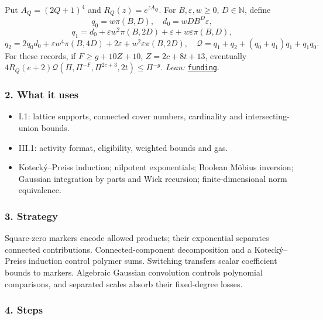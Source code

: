 \documentclass[
  letterpaper,
  11pt]{article}
\providecommand{\tightlist}{%
  \setlength{\itemsep}{0pt}\setlength{\parskip}{0pt}}
\begin{document}
Put \(A_Q=(2Q+1)^4\) and \(R_Q(z)=e^{zA_Q}\). For
\(B,\varepsilon,w\ge0\), \(D\in\mathbb N\), define
\[q_0=w\pi(B,D),\quad d_0=wDB^D\varepsilon,\]
\[q_1=d_0+\varepsilon w^2\pi(B,2D)+\varepsilon+w\varepsilon\pi(B,D),\]
\[q_2=2q_0d_0+\varepsilon w^4\pi(B,4D)+2\varepsilon+w^2\varepsilon\pi(B,2D),\quad\mathcal Q=q_1+q_2+(q_0+q_1)q_1+q_1q_0.\]
For these records, if \(F\ge g+10Z+10\), \(Z=2c+8t+13\), eventually
\(4R_Q(e+2)\mathcal Q(\Pi,\Pi^{-F},\Pi^{2c+3},2t)\le\Pi^{-g}\).
\emph{Lean:}
\href{https://github.com/yang-mills-group/OpenAI-YM-20261028/blob/3456e5e75cf8d4cd558955a5c7638fba2d68f464/YM/Next/RANK/Purchased.lean\#L49-L56}{\texttt{funding}}.

\subsubsection{2. What it uses}\label{what-it-uses-2}

\begin{itemize}
\tightlist
\item
  I.1: lattice supports, connected cover numbers, cardinality and
  intersecting-union bounds.
\item
  III.1: activity format, eligibility, weighted bounds and gas.
\item
  Kotecký--Preiss induction; nilpotent exponentials; Boolean Möbius
  inversion; Gaussian integration by parts and Wick recursion;
  finite-dimensional norm equivalence.
\end{itemize}

\subsubsection{3. Strategy}\label{strategy-2}

Square-zero markers encode allowed products; their exponential separates
connected contributions. Connected-component decomposition and a
Kotecký--Preiss induction control polymer sums. Switching transfers
scalar coefficient bounds to markers. Algebraic Gaussian convolution
controls polynomial comparisons, and separated scales absorb their
fixed-degree losses.

\subsubsection{4. Steps}\label{steps-2}
\end{document}
